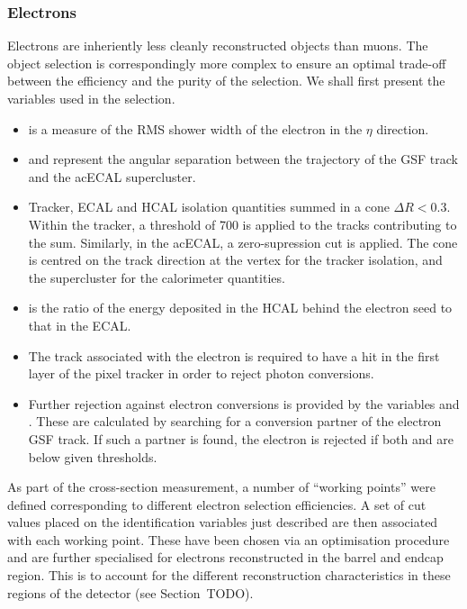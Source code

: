 \subsubsection{Electrons}
\label{sec:wpol_electronid}
Electrons are inheriently less cleanly reconstructed objects than muons. The
object selection is correspondingly more complex to ensure an optimal trade-off
between the efficiency and the purity of the selection. We shall first present
the variables used in the selection.

\begin{itemize}
\item \sigmaieta is a measure of the \ac{RMS} shower width of the electron
  in the $\eta$ direction.
\item \deltaphiin and \deltaetain represent the angular separation between the
  trajectory of the \ac{GSF} track and the ac{ECAL} supercluster.
\item Tracker, \ac{ECAL} and \ac{HCAL} isolation quantities summed in a cone
  $\Delta R < 0.3$. Within the tracker, a threshold of \unit{700}{\GeV} is
  applied to the tracks contributing to the sum. Similarly, in the ac{ECAL}, a
  zero-supression cut is applied. The cone is centred on the track direction at
  the vertex for the tracker isolation, and the supercluster for the calorimeter
  quantities.
\item \HoverE is the ratio of the energy deposited in the \ac{HCAL} behind the
  electron seed to that in the \ac{ECAL}.
\item The track associated with the electron is required to have a hit in the
  first layer of the pixel tracker in order to reject photon conversions.
\item Further rejection against electron conversions is provided by the
  variables \Dist and \DeltaCotTheta. These are calculated by searching for a
  conversion partner of the electron \ac{GSF} track. If such a partner is found,
  the electron is rejected if both \Dist and \DeltaCotTheta are below given thresholds.
\end{itemize}

As part of the \PW cross-section measurement, a number of ``working points''
were defined corresponding to different electron selection efficiencies. A set
of cut values placed on the identification variables just described are then
associated with each working point. These have been chosen via an optimisation
procedure and are further specialised for electrons reconstructed in the barrel
and endcap region. This is to account for the different reconstruction
characteristics in these regions of the detector (see Section~TODO).

